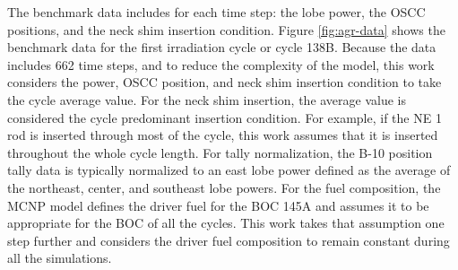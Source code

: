 

The benchmark data includes for each time step: the lobe power, the OSCC positions, and the neck shim insertion condition.
Figure \ref{fig:agr-data} shows the benchmark data for the first irradiation cycle or cycle 138B.
Because the data includes 662 time steps, and to reduce the complexity of the model, this work considers the power, OSCC position, and neck shim insertion condition to take the cycle average value.
For the neck shim insertion, the average value is considered the cycle predominant insertion condition.
For example, if the NE 1 rod is inserted through most of the cycle, this work assumes that it is inserted throughout the whole cycle length.
For tally normalization, the B-10 position tally data is typically normalized to an east lobe power defined as the average of the northeast, center, and southeast lobe powers.
For the fuel composition, the MCNP model defines the driver fuel for the \gls*{BOC} 145A and assumes it to be appropriate for the \gls*{BOC} of all the cycles.
This work takes that assumption one step further and considers the driver fuel composition to remain constant during all the simulations.

